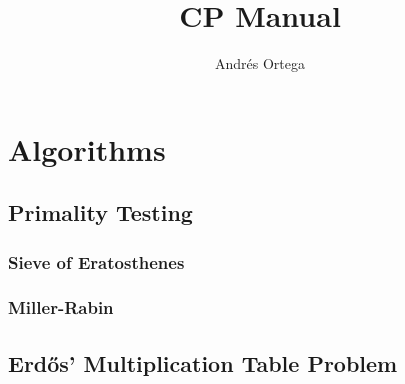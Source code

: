 \documentclass[12pt]{article}
\newcommand{\<}{\langle}
\renewcommand{\>}{\rangle}
\renewcommand{\(}{\left(}
\renewcommand{\)}{\right)}
\begin{document}
\title{CP Manual}
\author{Andrés Ortega}
\date{}

\maketitle


\section{Algorithms}
\subsection{Primality Testing}
    \subsubsection{Sieve of Eratosthenes}
        

    \subsubsection{Miller-Rabin}
        

\subsection{Erdős' Multiplication Table Problem}

\end{document}
